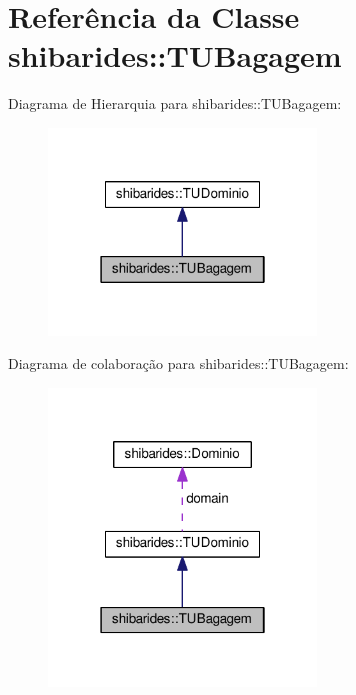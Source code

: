 \hypertarget{classshibarides_1_1TUBagagem}{}\section{Referência da Classe shibarides\+:\+:T\+U\+Bagagem}
\label{classshibarides_1_1TUBagagem}


Diagrama de Hierarquia para shibarides\+:\+:T\+U\+Bagagem\+:\nopagebreak
\begin{figure}[H]
\begin{center}
\leavevmode
\includegraphics[width=202pt]{classshibarides_1_1TUBagagem__inherit__graph}
\end{center}
\end{figure}


Diagrama de colaboração para shibarides\+:\+:T\+U\+Bagagem\+:\nopagebreak
\begin{figure}[H]
\begin{center}
\leavevmode
\includegraphics[width=202pt]{classshibarides_1_1TUBagagem__coll__graph}
\end{center}
\end{figure}

